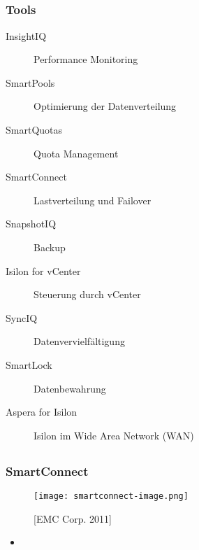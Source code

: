 \documentclass{beamer}
\begin{document}
\subsection{}
\begin{frame}[fragile]
  \frametitle{Tools}

  \begin{description}
    \item[InsightIQ] Performance Monitoring
    \item[SmartPools] Optimierung der Datenverteilung
    \item[SmartQuotas] Quota Management
    \item[SmartConnect] Lastverteilung und Failover
    \item[SnapshotIQ] Backup
    \item[Isilon for vCenter] Steuerung durch vCenter
    \item[SyncIQ] Datenvervielfältigung
    \item[SmartLock] Datenbewahrung
    \item[Aspera for Isilon] Isilon im Wide Area Network (WAN)
  \end{description}

\end{frame}    

\subsection{}
\begin{frame}[fragile]
  \frametitle{SmartConnect}
  
  \begin{figure}[htp]
    \centering
    \texttt{[image: smartconnect-image.png]}
    \caption{[EMC Corp. 2011]}
  \end{figure}

  \begin{itemize}
    \item[] 
  \end{itemize}

\end{frame}    
\end{document}
